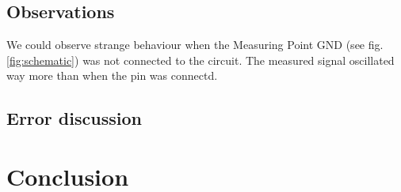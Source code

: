 \documentclass[a4paper,11pt]{article}
\begin{document}
\subsection{Observations}
We could observe strange behaviour when the Measuring Point GND (see fig. \ref{fig:schematic}) was not connected to the circuit. The measured signal oscillated way more than when the pin was connectd.


\subsection{Error discussion}


\section{Conclusion}



\end{document}
